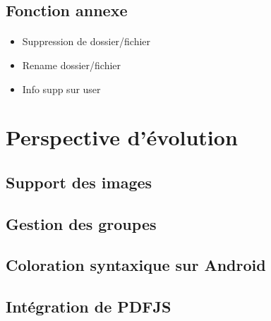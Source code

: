 \documentclass[a4paper,12pt]{article}
\begin{document}
\subsection{Fonction annexe}
\paragraph*{}
\begin{itemize}
 \item Suppression de dossier/fichier
 \item Rename dossier/fichier
 \item Info supp sur user
\end{itemize}

\section{Perspective d'évolution}
\subsection{Support des images}
\paragraph*{}

\subsection{Gestion des groupes}
\paragraph*{}

\subsection{Coloration syntaxique sur Android}
\paragraph*{}

\subsection{Intégration de PDFJS}
\paragraph*{}
\end{document}
